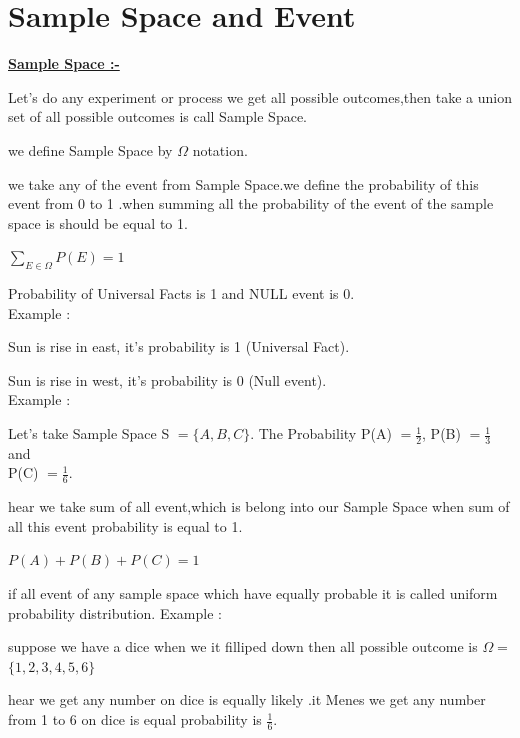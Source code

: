 \documentclass[a4paper,12pt]{article}
\theoremstyle{definition}
\begin{document}
\section {Sample Space and Event}
\textbf{\underline{Sample Space :-}}  
\vskip 0.25cm
\par Let's do any experiment or process we get  all possible outcomes,then take a union set of all possible outcomes is call Sample Space.\\
\par we define Sample Space by $\Omega$ notation.
\vskip 0.25cm
\par we take any of the event from Sample Space.we define the probability of this event from 0 to 1 .when summing all the probability of the event of the sample space is should be equal to 1. \\
\par\begin{center}
       $\sum_{E\in \Omega}{P(E)}=1 $\\
       \end{center}\par
\par  Probability of  Universal Facts is 1 and NULL event is 0.\\
\vskip 0.25cm
Example :
\par Sun is rise in east, it's probability is 1 (Universal Fact).\par
Sun is rise in west, it's probability is 0 (Null event).\\
\vskip 0.25cm
Example :
\par Let's take Sample Space S $=\{A,B,C\}$. The Probability P(A) $=\frac{1}{2}$,
 P(B) $=\frac{1}{3}$ and \\
P(C) $=\frac{1}{6}$.
\vskip 0.5cm

\par hear we take sum of all event,which is belong into our Sample Space  when sum of all this event probability is equal to 1.\\
   \begin{center}
        $ P(A)+P(B)+P(C)=1 $ 
   \end{center}
\par if all event of any sample space which have equally probable it is called uniform probability distribution.
\vskip 0.25cm
Example :
\par suppose we have a dice when we it filliped down then all possible outcome
is $\Omega= $ $\{1,2,3,4,5,6\} $
\vskip 0.5cm
\par hear we get any number on dice is equally likely .it Menes we get any number from 1 to 6 on dice is equal probability is $\frac{1}{6}.$ 
\end{document}
